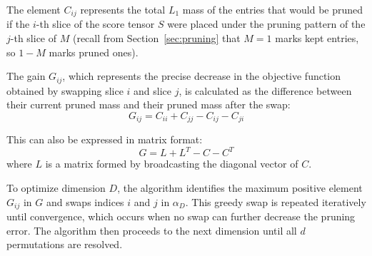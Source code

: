 The element $C_{ij}$ represents the total $L_1$ mass of the entries that would be pruned if the $i$-th slice of the score tensor $S$ were placed under the pruning pattern of the $j$-th slice of $M$ (recall from Section~\ref{sec:pruning} that $M = 1$ marks kept entries, so $1 - M$ marks pruned ones).

The gain $G_{ij}$, which represents the precise decrease in the objective function obtained by swapping slice $i$ and slice $j$, is calculated as the difference between their current pruned mass and their pruned mass after the swap:
$$ G_{ij} = C_{ii} + C_{jj} - C_{ij} - C_{ji} $$

This can also be expressed in matrix format:
$$ G = L + L^T - C - C^T $$
where $L$ is a matrix formed by broadcasting the diagonal vector of $C$. 

To optimize dimension $D$, the algorithm identifies the maximum positive element $G_{ij}$ in $G$ and swaps indices $i$ and $j$ in $\alpha_D$. This greedy swap is repeated iteratively until convergence, which occurs when no swap can further decrease the pruning error. The algorithm then proceeds to the next dimension until all $d$ permutations are resolved.
